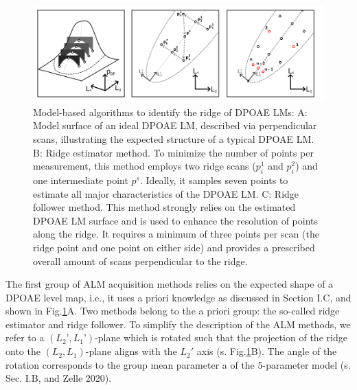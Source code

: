 \documentclass[journal,twoside,web]{ieeecolor2}
\begin{document}
\begin{figure}
\includegraphics[width=\textwidth]{Fig_ALM_ModelBased} %
\caption{Model-based algorithms to identify the ridge of DPOAE LMs: A: Model surface of an ideal DPOAE LM, described via perpendicular scans, illustrating the expected structure of a typical DPOAE LM.
B: Ridge estimator method.
To minimize the number of points per measurement, this method employs two ridge scans ($p^1_i$ and $p^2_i$) and one intermediate point $p^s$.
Ideally, it samples seven points to estimate all major characteristics of the DPOAE LM.
C: Ridge follower method.
This method strongly relies on the estimated DPOAE LM surface and is used to enhance the resolution of points along the ridge.
It requires a minimum of three points per scan (the ridge point and one point on either side) and provides a prescribed overall amount of scans perpendicular to the ridge.}
\label{fig_AMB}
\end{figure}

The first group of ALM acquisition methods relies on the expected shape of a DPOAE level map, i.e., it uses a priori knowledge as discussed in Section I.C, and shown in Fig.\ref{fig_AMB}A.
Two methods belong to the a priori group: the so-called ridge estimator and ridge follower.
To simplify the description of the ALM methods, we refer to a $(L_2’, L_1’)$-plane which is rotated such that the projection of the ridge onto the $(L_2, L_1)$-plane aligns with the $L_2'$ axis (s.
Fig.\ref{fig_AMB}B).
 The angle of the rotation corresponds to the group mean parameter a of the 5-parameter model (s.
Sec.
I.B, and Zelle 2020).
\end{document}
